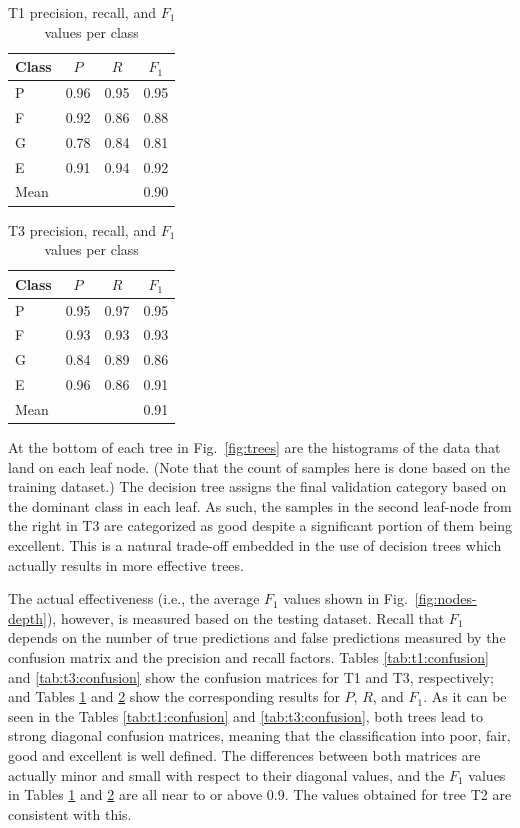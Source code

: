 \begin{table}[t]
	\centering
	\caption{T1 precision, recall, and $F_1$ values per class}
	\label{tab:t1:f1}
	\small
	\begin{tabular}{lccc}
	Class   & $P$	& $R$  	& $F_1$ \\ 
	\hline
	P 		& 0.96 	& 0.95 	& 0.95 	\\
	F 		& 0.92 	& 0.86 	& 0.88 	\\
	G 		& 0.78 	& 0.84 	& 0.81 	\\
	E 		& 0.91 	& 0.94 	& 0.92 	\\
	\hline
	Mean 	&		&		& 0.90	\\
	\end{tabular}
\end{table}

\begin{table}[t]
	\centering
	\caption{T3 precision, recall, and $F_1$ values per class}
	\label{tab:t3:f1}
	\small
	\begin{tabular}{lccc}
	Class   & $P$	& $R$  	& $F_1$ \\ 
	\hline
	P 		& 0.95 	& 0.97 	& 0.95 	\\
	F 		& 0.93 	& 0.93 	& 0.93 	\\
	G 		& 0.84 	& 0.89 	& 0.86 	\\
	E 		& 0.96 	& 0.86 	& 0.91 	\\
	\hline
	Mean 	&		&		& 0.91	\\
	\end{tabular}
\end{table}

At the bottom of each tree in Fig.~\ref{fig:trees} are the histograms of the data that land on each leaf node. (Note that the count of samples here is done based on the training dataset.) The decision tree assigns the final validation category based on the dominant class in each leaf. As such, the samples in the second leaf-node from the right in T3 are categorized as good despite a significant portion of them being excellent. This is a natural trade-off embedded in the use of decision trees which actually results in more effective trees. 

The actual effectiveness (i.e., the average $F_1$ values shown in Fig.~\ref{fig:nodes-depth}), however, is measured based on the testing dataset. Recall that $F_1$ depends on the number of true predictions and false predictions measured by the confusion matrix and the precision and recall factors. Tables \ref{tab:t1:confusion} and \ref{tab:t3:confusion} show the confusion matrices for T1 and T3, respectively; and Tables \ref{tab:t1:f1} and \ref{tab:t3:f1} show the corresponding results for $P$, $R$, and $F_1$. As it can be seen in the Tables \ref{tab:t1:confusion} and \ref{tab:t3:confusion}, both trees lead to strong diagonal confusion matrices, meaning that the classification into poor, fair, good and excellent is well defined. The differences between both matrices are actually minor and small with respect to their diagonal values, and the $F_1$ values in Tables \ref{tab:t1:f1} and \ref{tab:t3:f1} are all near to or above 0.9. The values obtained for tree T2 are consistent with this.

